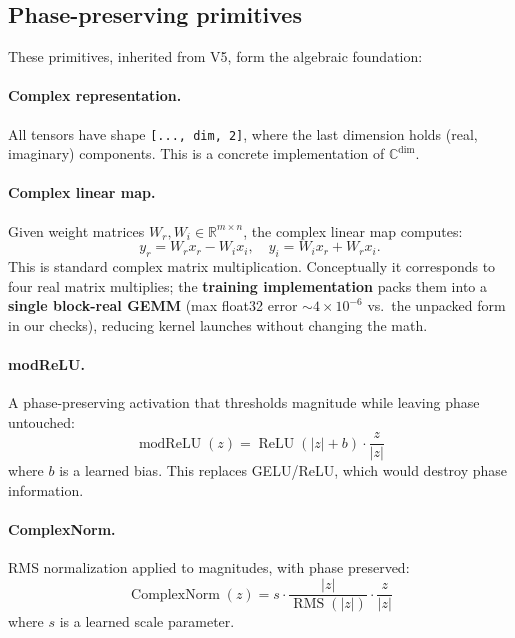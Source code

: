 \documentclass[11pt]{article}
\newcommand{\Complex}{\mathbb{C}}
\begin{document}
\subsection{Phase-preserving primitives}
These primitives, inherited from V5, form the algebraic foundation:

\paragraph{Complex representation.} All tensors have shape \texttt{[..., dim, 2]}, where the last dimension holds (real, imaginary) components. This is a concrete implementation of $\Complex^{\text{dim}}$.

\paragraph{Complex linear map.} Given weight matrices $W_r, W_i \in \mathbb{R}^{m \times n}$, the complex linear map computes:
\begin{equation}
  y_r = W_r x_r - W_i x_i, \quad y_i = W_i x_r + W_r x_i .
\end{equation}
This is standard complex matrix multiplication. Conceptually it corresponds to four real matrix multiplies; the \textbf{training implementation} packs them into a \textbf{single block-real GEMM} (max float32 error $\sim 4\times 10^{-6}$ vs.\ the unpacked form in our checks), reducing kernel launches without changing the math.

\paragraph{modReLU.} A phase-preserving activation that thresholds magnitude while leaving phase untouched:
\begin{equation}
  \operatorname{modReLU}(z) = \operatorname{ReLU}(|z| + b) \cdot \frac{z}{|z|}
\end{equation}
where $b$ is a learned bias. This replaces GELU/ReLU, which would destroy phase information.

\paragraph{ComplexNorm.} RMS normalization applied to magnitudes, with phase preserved:
\begin{equation}
  \operatorname{ComplexNorm}(z) = s \cdot \frac{|z|}{\operatorname{RMS}(|z|)} \cdot \frac{z}{|z|}
\end{equation}
where $s$ is a learned scale parameter.
\end{document}
